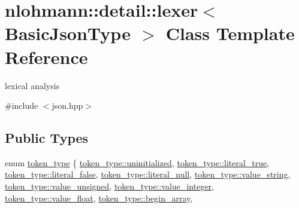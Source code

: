\hypertarget{classnlohmann_1_1detail_1_1lexer}{}\section{nlohmann\+::detail\+::lexer$<$ Basic\+Json\+Type $>$ Class Template Reference}
\label{classnlohmann_1_1detail_1_1lexer}


lexical analysis  




{\ttfamily \#include $<$json.\+hpp$>$}

\subsection*{Public Types}
\begin{DoxyCompactItemize}
\item 
enum \mbox{\hyperlink{classnlohmann_1_1detail_1_1lexer_a3f313cdbe187cababfc5e06f0b69b098}{token\+\_\+type}} \{ \newline
\mbox{\hyperlink{classnlohmann_1_1detail_1_1lexer_a3f313cdbe187cababfc5e06f0b69b098a42dd1a73d072bb6bf3f494f22b15db8e}{token\+\_\+type\+::uninitialized}}, 
\mbox{\hyperlink{classnlohmann_1_1detail_1_1lexer_a3f313cdbe187cababfc5e06f0b69b098a85cc1a37b0aaa52de40e72f0ed4e0c0d}{token\+\_\+type\+::literal\+\_\+true}}, 
\mbox{\hyperlink{classnlohmann_1_1detail_1_1lexer_a3f313cdbe187cababfc5e06f0b69b098afab1694b1b3937a079f4625fe0b6108b}{token\+\_\+type\+::literal\+\_\+false}}, 
\mbox{\hyperlink{classnlohmann_1_1detail_1_1lexer_a3f313cdbe187cababfc5e06f0b69b098ab7ae4c0e46d86f884677768160b26e9e}{token\+\_\+type\+::literal\+\_\+null}}, 
\newline
\mbox{\hyperlink{classnlohmann_1_1detail_1_1lexer_a3f313cdbe187cababfc5e06f0b69b098a2b490e8bf366b4cbe3ebd99b26ce15ce}{token\+\_\+type\+::value\+\_\+string}}, 
\mbox{\hyperlink{classnlohmann_1_1detail_1_1lexer_a3f313cdbe187cababfc5e06f0b69b098aaf1f040fcd2f674d2e5893d7a731078f}{token\+\_\+type\+::value\+\_\+unsigned}}, 
\mbox{\hyperlink{classnlohmann_1_1detail_1_1lexer_a3f313cdbe187cababfc5e06f0b69b098a5064b6655d88a50ae16665cf7751c0ee}{token\+\_\+type\+::value\+\_\+integer}}, 
\mbox{\hyperlink{classnlohmann_1_1detail_1_1lexer_a3f313cdbe187cababfc5e06f0b69b098a0d2671a6f81efb91e77f6ac3bdb11443}{token\+\_\+type\+::value\+\_\+float}}, 
\newline
\mbox{\hyperlink{classnlohmann_1_1detail_1_1lexer_a3f313cdbe187cababfc5e06f0b69b098a16c226b4425b68560fea322b46dabe01}{token\+\_\+type\+::begin\+\_\+array}}, 

\end{DoxyCompactItemize}
